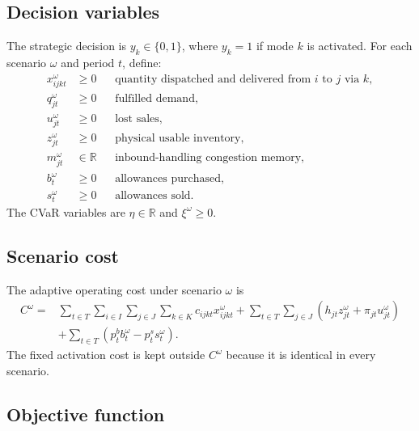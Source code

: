 \documentclass[11pt,a4paper]{article}
\newcommand{\R}{\mathbb{R}}
\begin{document}
\subsection{Decision variables}

The strategic decision is \(y_k\in\{0,1\}\), where \(y_k=1\) if mode \(k\)
is activated. For each scenario \(\omega\) and period \(t\), define:
\begin{align*}
  x_{ijkt}^{\omega}&\geq0 &&\text{quantity dispatched and delivered
  from \(i\) to \(j\) via \(k\)},\\
  q_{jt}^{\omega}&\geq0 &&\text{fulfilled demand},\\
  u_{jt}^{\omega}&\geq0 &&\text{lost sales},\\
  z_{jt}^{\omega}&\geq0 &&\text{physical usable inventory},\\
  m_{jt}^{\omega}&\in\R &&\text{inbound-handling congestion memory},\\
  b_t^\omega&\geq0 &&\text{allowances purchased},\\
  s_t^\omega&\geq0 &&\text{allowances sold}.
\end{align*}
The CVaR variables are \(\eta\in\R\) and \(\xi^\omega\geq0\).

\subsection{Scenario cost}

The adaptive operating cost under scenario \(\omega\) is
\begin{align}
  C^\omega
  ={}&
  \sum_{t\in T}
  \sum_{i\in I}
  \sum_{j\in J}
  \sum_{k\in K}
  c_{ijkt}x_{ijkt}^{\omega}
  +
  \sum_{t\in T}
  \sum_{j\in J}
  \left(
    h_{jt}z_{jt}^{\omega}
    +
    \pi_{jt}u_{jt}^{\omega}
  \right)
  \nonumber\\
  &+
  \sum_{t\in T}
  \left(
    p_t^b b_t^\omega
    -
    p_t^s s_t^\omega
  \right).
  \label{eq:scenario-cost}
\end{align}
The fixed activation cost is kept outside \(C^\omega\) because it is
identical in every scenario.

\subsection{Objective function}
\end{document}
